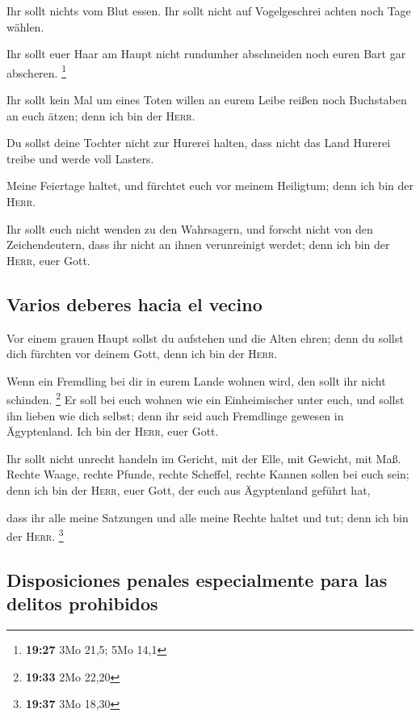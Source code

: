  Ihr sollt nichts vom Blut essen. Ihr sollt nicht auf
Vogelgeschrei achten noch Tage wählen.

 Ihr sollt euer Haar am Haupt nicht rundumher abschneiden
noch euren Bart gar abscheren. \footnote{\textbf{19:27} 3Mo 21,5; 5Mo
  14,1}

 Ihr sollt kein Mal um eines Toten willen an eurem Leibe
reißen noch Buchstaben an euch ätzen; denn ich bin der \textsc{Herr}.

 Du sollst deine Tochter nicht zur Hurerei halten, dass
nicht das Land Hurerei treibe und werde voll Lasters.

 Meine Feiertage haltet, und fürchtet euch vor meinem
Heiligtum; denn ich bin der \textsc{Herr}.

 Ihr sollt euch nicht wenden zu den Wahrsagern, und
forscht nicht von den Zeichendeutern, dass ihr nicht an ihnen
verunreinigt werdet; denn ich bin der \textsc{Herr}, euer Gott.

\hypertarget{varios-deberes-hacia-el-vecino}{%
\subsection{Varios deberes hacia el
vecino}\label{varios-deberes-hacia-el-vecino}}

 Vor einem grauen Haupt sollst du aufstehen und die Alten
ehren; denn du sollst dich fürchten vor deinem Gott, denn ich bin der
\textsc{Herr}.

 Wenn ein Fremdling bei dir in eurem Lande wohnen wird,
den sollt ihr nicht schinden. \footnote{\textbf{19:33} 2Mo 22,20}
 Er soll bei euch wohnen wie ein Einheimischer unter
euch, und sollst ihn lieben wie dich selbst; denn ihr seid auch
Fremdlinge gewesen in Ägyptenland. Ich bin der \textsc{Herr}, euer Gott.

 Ihr sollt nicht unrecht handeln im Gericht, mit der
Elle, mit Gewicht, mit Maß.  Rechte Waage, rechte Pfunde,
rechte Scheffel, rechte Kannen sollen bei euch sein; denn ich bin der
\textsc{Herr}, euer Gott, der euch aus Ägyptenland geführt hat,

 dass ihr alle meine Satzungen und alle meine Rechte
haltet und tut; denn ich bin der \textsc{Herr}. \footnote{\textbf{19:37}
  3Mo 18,30}

\hypertarget{disposiciones-penales-especialmente-para-las-delitos-prohibidos}{%
\subsection{Disposiciones penales especialmente para las delitos
prohibidos}\label{disposiciones-penales-especialmente-para-las-delitos-prohibidos}}


